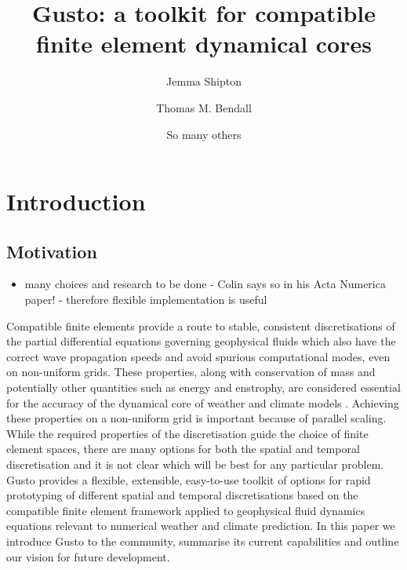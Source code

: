 \documentclass[11pt, a4paper]{article}
\begin{document}
\author[1,*]{Jemma Shipton}
\author[2]{Thomas M. Bendall}
\author[3]{So many others}


\title{Gusto: a toolkit for compatible finite element dynamical cores}
\date{}

\maketitle

\section{Introduction}

\subsection{Motivation}
\begin{itemize}
\item many choices and research to be done - Colin says so in his Acta Numerica paper! - therefore flexible implementation is useful
\end{itemize}

Compatible finite elements provide a route to stable, consistent
discretisations of the partial differential equations governing
geophysical fluids which also have the correct wave propagation speeds
and avoid spurious computational modes, even on non-uniform
grids. These properties, along with conservation of mass and
potentially other quantities such as energy and enstrophy, are
considered essential for the accuracy of the dynamical core of weather
and climate models \citep{staniforth2012horizontal}. Achieving these
properties on a non-uniform grid is important because of parallel
scaling. While the required properties of the discretisation guide the
choice of finite element spaces, there are many options for both the
spatial and temporal discretisation and it is not clear which will be
best for any particular problem. Gusto provides a flexible,
extensible, easy-to-use toolkit of options for rapid prototyping of
different spatial and temporal discretisations based on the compatible
finite element framework applied to geophysical fluid dynamics
equations relevant to numerical weather and climate prediction. In
this paper we introduce Gusto to the community, summarise its current
capabilities and outline our vision for future development.
\end{document}
